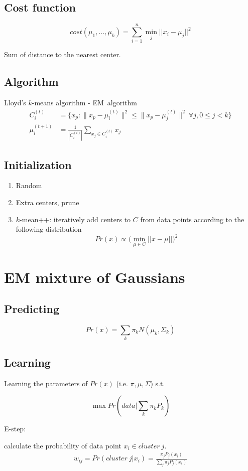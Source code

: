\documentclass[a4paper]{report}
\begin{document}
\subsection{Cost function}
$$
cost(\mu_1, ..., \mu_k) = \sum_{i=1}^n \min_j ||x_i-\mu_j||^2
$$

Sum of distance to the nearest center. 

\subsection{Algorithm}
Lloyd’s $k$-means algorithm - EM\ algorithm
\begin{align*}
C_i^{(t)}& = \big \{ x_p : \| x_p - \mu^{(t)}_i \|^2 \le \big \| x_p - \mu^{(t)}_j \|^2 \ \forall j, 0 \le j < k \big\}  \\
\mu^{(t+1)}_i &= \frac{1}{|C^{(t)}_i|} \sum_{x_j \in C^{(t)}_i} x_j 
\end{align*}

\subsection{Initialization}
\begin{enumerate}
\item Random
\item Extra centers, prune
\item $k$-mean++: iteratively add centers to $C$ from data points according to the following distribution 
$$
Pr(x) \propto \big(\min_{\mu \in C}||x-\mu||\big)^2
$$


\end{enumerate}
\section{EM mixture of Gaussians}
\subsection{Predicting}
$$
Pr(x) = \sum_k \pi_k N(\mu_k, \Sigma_k)
$$

\subsection{Learning}
Learning the parameters of $Pr(x)$ (i.e. $\pi, \mu, \Sigma$) s.t.

$$
\max Pr(data|\sum_k \pi_k P_k)
$$

E-step:

calculate the probability of data point $x_i \in cluster~j$. 
\begin{align*}
w_{ij} = Pr(cluster~j|x_i) = \frac{\pi_j P_j(x_i)}{\sum_j \pi_j P_j(x_i)}
\end{align*}
\end{document}
